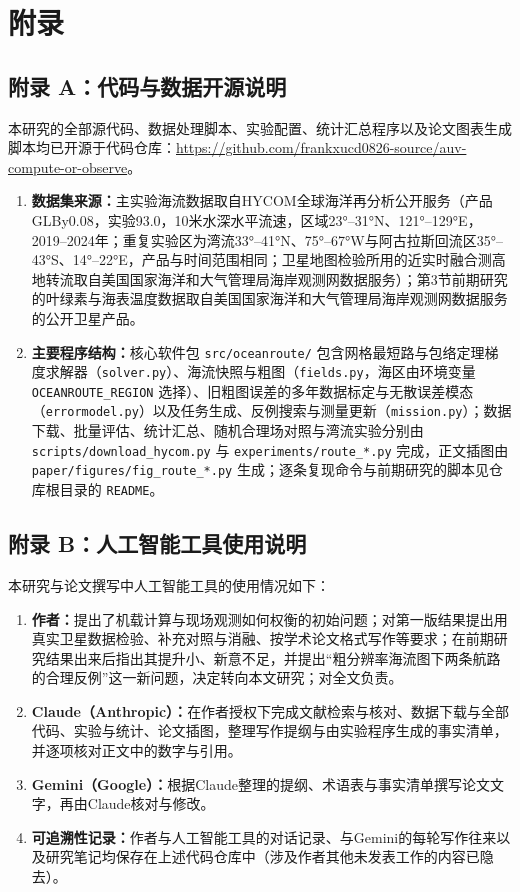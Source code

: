 \section*{附录}

\subsection*{附录 A：代码与数据开源说明}
本研究的全部源代码、数据处理脚本、实验配置、统计汇总程序以及论文图表生成脚本均已开源于代码仓库：\url{https://github.com/frankxucd0826-source/auv-compute-or-observe}。

\begin{enumerate}
    \item \textbf{数据集来源：}主实验海流数据取自HYCOM全球海洋再分析公开服务（产品GLBy0.08，实验93.0，10米水深水平流速，区域23°--31°N、121°--129°E，2019--2024年；重复实验区为湾流33°--41°N、75°--67°W与阿古拉斯回流区35°--43°S、14°--22°E，产品与时间范围相同；卫星地图检验所用的近实时融合测高地转流取自美国国家海洋和大气管理局海岸观测网数据服务）；第3节前期研究的叶绿素与海表温度数据取自美国国家海洋和大气管理局海岸观测网数据服务的公开卫星产品。
    \item \textbf{主要程序结构：}核心软件包 \texttt{src/oceanroute/} 包含网格最短路与包络定理梯度求解器（\texttt{solver.py}）、海流快照与粗图（\texttt{fields.py}，海区由环境变量 \texttt{OCEANROUTE\_REGION} 选择）、旧粗图误差的多年数据标定与无散误差模态（\texttt{errormodel.py}）以及任务生成、反例搜索与测量更新（\texttt{mission.py}）；数据下载、批量评估、统计汇总、随机合理场对照与湾流实验分别由 \texttt{scripts/download\_hycom.py} 与 \texttt{experiments/route\_*.py} 完成，正文插图由 \texttt{paper/figures/fig\_route\_*.py} 生成；逐条复现命令与前期研究的脚本见仓库根目录的 \texttt{README}。
\end{enumerate}

\subsection*{附录 B：人工智能工具使用说明}
本研究与论文撰写中人工智能工具的使用情况如下：
\begin{enumerate}
    \item \textbf{作者：}提出了机载计算与现场观测如何权衡的初始问题；对第一版结果提出用真实卫星数据检验、补充对照与消融、按学术论文格式写作等要求；在前期研究结果出来后指出其提升小、新意不足，并提出“粗分辨率海流图下两条航路的合理反例”这一新问题，决定转向本文研究；对全文负责。
    \item \textbf{Claude（Anthropic）：}在作者授权下完成文献检索与核对、数据下载与全部代码、实验与统计、论文插图，整理写作提纲与由实验程序生成的事实清单，并逐项核对正文中的数字与引用。
    \item \textbf{Gemini（Google）：}根据Claude整理的提纲、术语表与事实清单撰写论文文字，再由Claude核对与修改。
    \item \textbf{可追溯性记录：}作者与人工智能工具的对话记录、与Gemini的每轮写作往来以及研究笔记均保存在上述代码仓库中（涉及作者其他未发表工作的内容已隐去）。
\end{enumerate}
